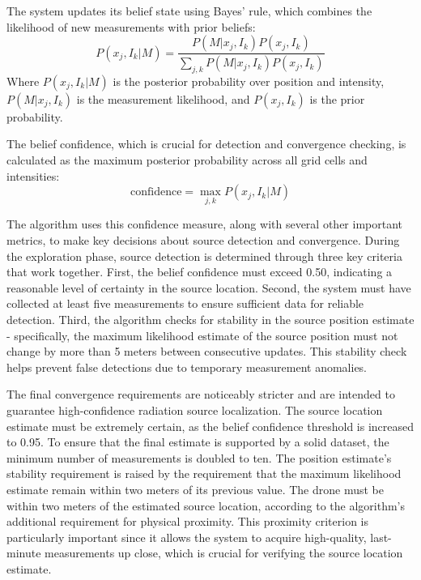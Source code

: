 \documentclass[../report.tex]{subfiles}
\begin{document}
    The system updates its belief state using Bayes' rule, which combines the likelihood of new measurements with prior beliefs:
    \begin{equation}
        P(x_j, I_k|M) = \frac{P(M|x_j, I_k)P(x_j, I_k)}{\sum_{j,k} P(M|x_j, I_k)P(x_j, I_k)}
    \end{equation}
    Where $P(x_j, I_k|M)$ is the posterior probability over position and intensity, $P(M|x_j,I_k)$ is the measurement likelihood, and $P(x_j,I_k)$ is the prior probability.

    The belief confidence, which is crucial for detection and convergence checking, is calculated as the maximum posterior probability across all grid cells and intensities:
    \begin{equation}
        \text{confidence} = \max_{j,k} P(x_j, I_k|M)
    \end{equation}

    The algorithm uses this confidence measure, along with several other important metrics, to make key decisions about source detection and convergence. During the exploration phase, source detection 
    is determined through three key criteria that work together. First, the belief confidence must exceed 0.50, indicating a reasonable level of certainty in the source location. Second, the system 
    must have collected at least five measurements to ensure sufficient data for reliable detection. Third, the algorithm checks for stability in the source position estimate - specifically, the 
    maximum likelihood estimate of the source position must not change by more than 5 meters between consecutive updates. This stability check helps prevent false detections due to temporary 
    measurement anomalies.
   
    The final convergence requirements are noticeably stricter and are intended to guarantee high-confidence radiation source localization. The source location estimate must be extremely certain, 
    as the belief confidence threshold is increased to 0.95. To ensure that the final estimate is supported by a solid dataset, the minimum number of measurements is doubled to ten. The position 
    estimate's stability requirement is raised by the requirement that the maximum likelihood estimate remain within two meters of its previous value. The drone must be within two meters of the 
    estimated source location, according to the algorithm's additional requirement for physical proximity. This proximity criterion is particularly important since it allows the system to acquire
     high-quality, last-minute measurements up close, which is crucial for verifying the source location estimate.
\end{document}
